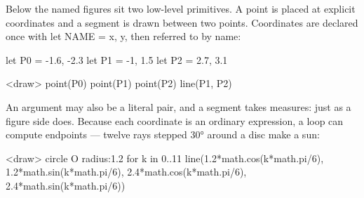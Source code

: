 \documentclass[
  margins=8,
  font=Latin Modern Roman,
  size=12,
  linespread=1.4,
  lang=en
]{scholatex}
\begin{document}
Below the named figures sit two low-level primitives. A point is placed at
explicit coordinates and a segment is drawn between two points. Coordinates
are declared once with let NAME = {x, y}, then referred to by name:

let P0 = {-1.6, -2.3}
let P1 = {-1, 1.5}
let P2 = {2.7, 3.1}

<draw>{
	point(P0)
	point(P1)
	point(P2)
	line(P1, P2)
}

An argument may also be a literal pair, and a segment takes measures: just
as a figure side does. Because each coordinate is an ordinary expression,
a loop can compute endpoints — twelve rays stepped 30° around a disc make a
sun:

<draw>{
	circle O radius:1.2
	for k in 0..11 {
		line({1.2*math.cos(k*math.pi/6), 1.2*math.sin(k*math.pi/6)}, {2.4*math.cos(k*math.pi/6), 2.4*math.sin(k*math.pi/6)})
	}
}
\end{document}
